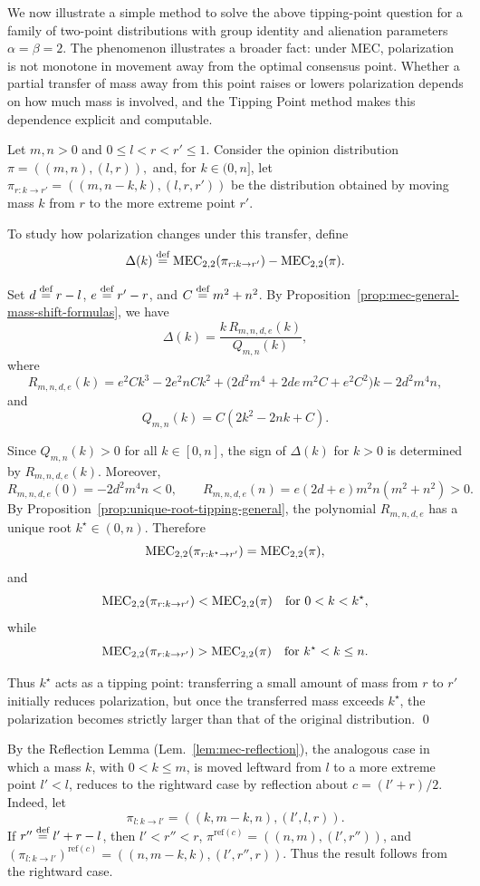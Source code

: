 We now illustrate a simple method to solve the above tipping-point question for a family of two-point distributions with group identity and alienation parameters $\alpha=\beta=2.$ The phenomenon illustrates a broader fact: under MEC, polarization is not monotone in movement away from the optimal consensus point. Whether a partial transfer of mass away from this point raises or lowers polarization depends on how much mass is involved, and the Tipping Point method makes this dependence explicit and computable.


\begin{example}
\label{ex:tipping-mass-shift-general}
Let \(m,n>0\) and \(0\le l<r<r'\le 1\). Consider the opinion distribution
\(
\pi=((m,n),(l,r)),
\)
and, for \(k\in(0,n]\), let
\(
\pi_{r:k\rightarrow r'}=((m,n-k,k),(l,r,r'))
\)
be the distribution obtained by moving mass \(k\) from \(r\) to the more extreme point \(r'\).

To study how polarization changes under this transfer, define
\[
\Delta(k)\defsymbol \MEC[2,2](\pi_{r:k\rightarrow r'})-\MEC[2,2](\pi).
\]

Set \(d\stackrel{\text{def}}{=} r-l\), \(e\stackrel{\text{def}}{=} r'-r\), and \(C\stackrel{\text{def}}{=} m^2+n^2\). By Proposition~\ref{prop:mec-general-mass-shift-formulas}, we have
\[
\Delta(k)=\frac{k\,R_{m,n,d,e}(k)}{Q_{m,n}(k)},
\]
where
\[
R_{m,n,d,e}(k)
=
e^2Ck^3-2e^2nCk^2+\bigl(2d^2m^4+2de\,m^2C+e^2C^2\bigr)k-2d^2m^4n,
\]
and
\[
Q_{m,n}(k)=C(2k^2-2nk+C).
\]

Since \(Q_{m,n}(k)>0\) for all \(k\in[0,n]\), the sign of \(\Delta(k)\) for \(k>0\) is determined by \(R_{m,n,d,e}(k)\). Moreover,
\[
R_{m,n,d,e}(0)=-2d^2m^4n<0,
\qquad
R_{m,n,d,e}(n)=e(2d+e)m^2n(m^2+n^2)>0.
\]
By Proposition~\ref{prop:unique-root-tipping-general}, the polynomial \(R_{m,n,d,e}\) has a unique root \(k^\star\in(0,n)\). Therefore
\[
\MEC[2,2](\pi_{r:k^\star\rightarrow r'})=\MEC[2,2](\pi),
\]
and
\[
\MEC[2,2](\pi_{r:k\rightarrow r'})<\MEC[2,2](\pi)
\quad\text{for }0<k<k^\star,
\]
while
\[
\MEC[2,2](\pi_{r:k\rightarrow r'})>\MEC[2,2](\pi)
\quad\text{for }k^\star<k\le n.
\]

Thus \(k^\star\) acts as a tipping point: transferring a small amount of mass from \(r\) to \(r'\) initially reduces polarization, but once the transferred mass exceeds \(k^\star\), the polarization becomes strictly larger than that of the original distribution. \qed
\end{example}

\begin{remark}
By the Reflection Lemma (Lem.~\ref{lem:mec-reflection}), the analogous case in which a mass \(k\), with \(0<k\le m\), is moved leftward from \(l\) to a more extreme point \(l'<l\), reduces to the rightward case by reflection about \(c=(l'+r)/2\). Indeed, let
\[
\pi_{l:k\to l'}=((k,m-k,n),(l',l,r)).
\]
If \(r''\stackrel{\text{def}}{=} l'+r-l\), then \(l'<r''<r\), \(\pi^{\mathrm{ref}(c)}=((n,m),(l',r''))\), and \((\pi_{l:k\to l'})^{\mathrm{ref}(c)}=((n,m-k,k),(l',r'',r))\). Thus the result follows from the rightward case.
\end{remark}

